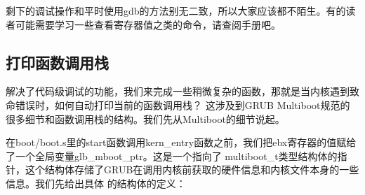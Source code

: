 \par 剩下的调试操作和平时使用gdb的方法别无二致，所以大家应该都不陌生。有的读者可能需要学习一些查看寄存器值之类的命令，请查阅手册吧。

\subsection{打印函数调用栈}

\par 解决了代码级调试的功能，我们来完成一些稍微复杂的函数，那就是当内核遇到致命错误时，如何自动打印当前的函数调用栈？\allowbreak
这涉及到GRUB Multiboot规范的很多细节和函数调用栈的结构。我们先从Multiboot的细节说起。

\par 在boot/boot.s里的start函数调用kern\_entry函数之前，我们把ebx寄存器的值赋给了一个全局变量glb\_mboot\_ptr。这是一个指向了\allowbreak
multiboot\_t类型结构体的指针，这个结构体存储了GRUB在调用内核前获取的硬件信息和内核文件本身的一些信息。我们先给出具体\allowbreak
的结构体的定义：

